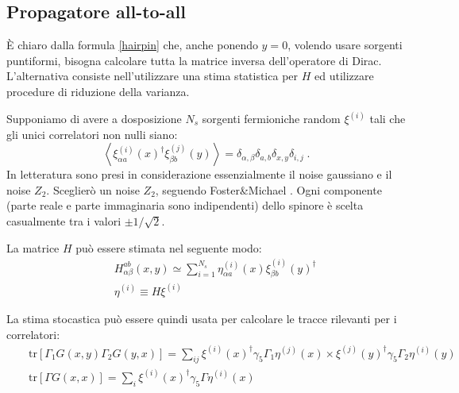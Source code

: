 \documentclass[a4paper]{article}
\newcommand{\tr}{\mathrm{tr}}
\newcommand{\point}{\; .}
\begin{document}
\subsection{Propagatore all-to-all}

\`{E} chiaro dalla formula \ref{hairpin} che, anche ponendo $y=0$, volendo usare sorgenti puntiformi, bisogna calcolare tutta la matrice inversa dell'operatore di Dirac. L'alternativa consiste nell'utilizzare una stima statistica per $H$ ed utilizzare procedure di riduzione della varianza.

Supponiamo di avere a dosposizione $N_s$ sorgenti fermioniche random $\xi^{(i)}$ tali che gli unici correlatori non nulli siano:
$$ \left< \xi^{(i)}_{\alpha a}(x)^\dagger \xi^{(j)}_{\beta b}(y) \right> = \delta_{\alpha,\beta} \delta_{a,b} \delta_{x,y} \delta_{i,j} \point $$
In letteratura sono presi in considerazione essenzialmente il noise gaussiano e il noise $Z_2$. Sceglier\`{o} un noise $Z_2$, seguendo Foster\&Michael \cite{Foster:1998vw}. Ogni componente (parte reale e parte immaginaria sono indipendenti) dello spinore \`{e} scelta casualmente tra i valori $\pm 1/\sqrt{2}$.


La matrice $H$ pu\`{o} essere stimata nel seguente modo:
\begin{eqnarray}
&& H_{\alpha \beta}^{a b}(x,y) \simeq \sum_{i=1}^{N_s} \eta^{(i)}_{\alpha a}(x) \xi^{(i)}_{\beta b}(y)^\dagger \label{naive_noisy_estimate} \\
&& \eta^{(i)} \equiv H \xi^{(i)} \nonumber
\end{eqnarray}

La stima stocastica pu\`{o} essere quindi usata per calcolare le tracce rilevanti per i correlatori:
\begin{eqnarray}
&& \tr \left[ \Gamma_1 G(x,y) \Gamma_2 G(y,x) \right] = \sum_{ij} \xi^{(i)}(x)^\dagger \gamma_5 \Gamma_1 \eta^{(j)}(x) \times \xi^{(j)}(y)^\dagger \gamma_5 \Gamma_2 \eta^{(i)}(y) \\
&& \tr \left[ \Gamma G(x,x) \right] = \sum_i \xi^{(i)}(x)^\dagger \gamma_5 \Gamma \eta^{(i)}(x)
\end{eqnarray}
\end{document}

